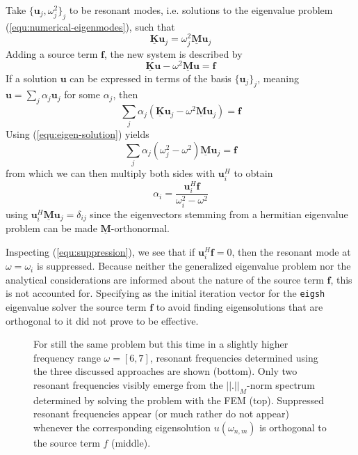 \documentclass[11pt, a4paper]{article}
\begin{document}
Take $\{ \mathbf{u}_j, \omega_j^2 \}_j$ to be resonant modes, i.e. solutions to 
the eigenvalue problem (\ref{equ:numerical-eigenmodes}), such that
\begin{equation}
    \mathbf{\underline{K}} \mathbf{u}_j = \omega_j^2 \mathbf{\underline{M}} \mathbf{u}_j
    \label{equ:eigen-solution}
\end{equation}
Adding a source term $\mathbf{f}$, the new system is described by
\begin{equation}
    \mathbf{\underline{K}} \mathbf{u} - \omega^2 \mathbf{\underline{M}} \mathbf{u} = \mathbf{f}
\end{equation}
If a solution $\mathbf{u}$ can be expressed in terms of the basis $\{ \mathbf{u}_j \}_j$,
meaning $\mathbf{u} = \sum_j \alpha_j \mathbf{u}_j$ for some $\alpha_j$, then
\begin{equation} 
    \sum_j \alpha_j (\mathbf{\underline{K}} \mathbf{u}_j - \omega^2 \mathbf{\underline{M}} \mathbf{u}_j) = \mathbf{f}
\end{equation}
Using (\ref{equ:eigen-solution}) yields
\begin{equation}
    \sum_j \alpha_j (\omega_j^2 - \omega^2) \mathbf{\underline{M}} \mathbf{u}_j = \mathbf{f}
\end{equation}
from which we can then multiply both sides with $\mathbf{u}_i^H$ to obtain
\begin{equation}
    \alpha_i = \frac{\mathbf{u}_i^H \mathbf{f}}{\omega_i^2 - \omega^2} \label{equ:suppression}
\end{equation}
using $\mathbf{u}_i^H \mathbf{\underline{M}} \mathbf{u}_j = \delta_{ij}$
since the eigenvectors stemming from a hermitian eigenvalue problem can be made 
$\mathbf{\underline{M}}$-orthonormal.

Inspecting (\ref{equ:suppression}), we see that if $\mathbf{u}_i^H \mathbf{f} = 0$,
then the resonant mode at $\omega = \omega_i$ is suppressed. Because neither the
generalized eigenvalue problem nor the analytical considerations
are informed about the nature of the source term $\mathbf{f}$, this is not accounted for.
Specifying as the initial iteration vector for the \texttt{eigsh} eigenvalue solver
the source term $\mathbf{f}$ to avoid finding eigensolutions that are orthogonal
to it did not prove to be effective.

\begin{figure}[ht]
    \centering
    
    \caption{For still the same problem but this time in a slightly higher
    frequency range $\omega = [6, 7]$, resonant frequencies determined using the
    three discussed approaches are shown (bottom). Only two resonant
    frequencies visibly emerge from the $||.||_M$-norm spectrum determined by
    solving the problem with the \acrshort{FEM} (top). Suppressed resonant
    frequencies appear (or much rather do not appear) whenever the corresponding
    eigensolution $u(\omega_{n, m})$ is orthogonal to the source term $f$ (middle).}
    \label{fig:rectangular-cavity-suppression}
\end{figure}
\end{document}
